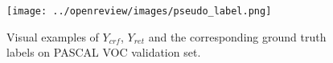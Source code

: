 
\begin{figure}[h!]
\begin{center}
\texttt{[image: ../openreview/images/pseudo\_label.png]}
\caption{\label{fig:bap_exp}{Visual examples of $Y_{crf}$, $Y_{ret}$ and the corresponding ground truth labels on PASCAL VOC validation set.}}
\end{center}
\end{figure}


